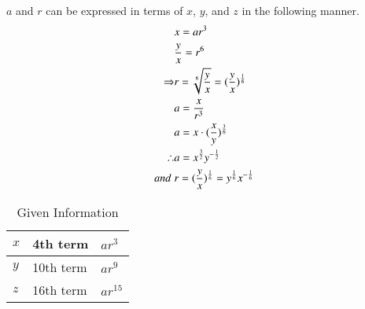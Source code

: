 \documentclass[journal,12pt,twocolumn]{IEEEtran}
\theoremstyle{remark}
\begin{document}
$a$ and $r$ can be expressed in terms of $x$, $y$, and $z$ in the following manner.
\begin{align}
\notag      &x=ar^3 \\
\notag    &\frac{y}{x}=r^6 \\
    \Rightarrow&r=\sqrt[6]{\frac{y}{x}}=(\frac{y}{x})^{\frac{1}{6}}\\
\notag    &a=\frac{x}{r^3}\\
\notag    &a=x\cdot(\frac{x}{y})^{\frac{3}{6}}\\
    \therefore &a=x^{\frac{3}{2}}y^{-\frac{1}{2}} \\
    and\; &r=(\frac{y}{x})^{\frac{1}{6}}= y^{\frac{1}{6}}x^{-\frac{1}{6}}
\end{align}


\begin{table}
    \centering
        \caption{Given Information}
    \begin{tabular}{|m{2cm}|m{2cm}|m{2cm}|}
    \hline
        $x$ & 4th term & $ar^3$\\ [1ex]
    \hline
        $y$ & 10th term& $ar^9$\\ [1ex]
    \hline
        $z$ & 16th term& $ar^{15}$\\ [1ex]
    \hline
    \end{tabular}
\end{table}
\end{document}
